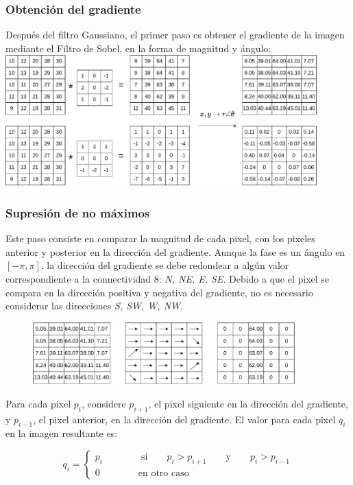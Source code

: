 \begin{frame}\frametitle{Obtención del gradiente}
  Después del filtro Gaussiano, el primer paso es obtener el gradiente de la imagen mediante el Filtro de Sobel, en la forma de magnitud y ángulo:\\
  \includegraphics[width=0.9\textwidth]{Figuras/SobelXY.pdf}
\end{frame}

\begin{frame}\frametitle{Supresión de no máximos}
  Este paso consiste en comparar la magnitud de cada pixel, con los pixeles anterior y posterior en la dirección del gradiente.
  Aunque la fase es un ángulo en $[-\pi, \pi]$, la dirección del gradiente se debe redondear a algún valor correspondiente a la connectividad 8: \textit{N, NE, E, SE}. Debido a que el pixel se compara en la dirección positiva y negativa del gradiente, no es necesario considerar las direcciones \textit{S, SW, W, NW}.
  \begin{figure}
    \centering
    \includegraphics[width=0.9\textwidth]{Figuras/SobelMA.pdf}
  \end{figure}
  Para cada pixel $p_i$, considere $p_{i+1}$, el pixel siguiente en la dirección del gradiente, y $p_{i-1}$, el pixel anterior, en la dirección del gradiente. El valor para cada pixel $q_i$ en la imagen resultante es:
  
  \[q_i = \begin{cases}p_i\qquad\qquad\textrm{si}\qquad p_i > p_{i+1} \qquad\textrm{y}\qquad p_i > p_{i-1}\\
  0\qquad\qquad\textrm{en otro caso}\end{cases}\]
\end{frame}

